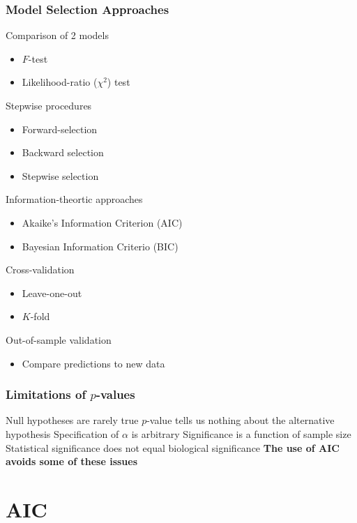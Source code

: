 \documentclass[color=usenames,dvipsnames]{beamer}\usepackage[]{graphicx}\usepackage[]{color}
\begin{document}
\begin{frame}
  \frametitle{Model Selection Approaches}
  Comparison of 2 models
  \begin{itemize}
    \item $F$-test
    \item Likelihood-ratio ($\chi^2$) test
  \end{itemize}
  \pause
  Stepwise procedures
  \begin{itemize}
    \item Forward-selection
    \item Backward selection
    \item Stepwise selection
  \end{itemize}
  \pause
  Information-theortic approaches
  \begin{itemize}
    \item Akaike's Information Criterion (AIC)
    \item Bayesian Information Criterio (BIC)
  \end{itemize}
  \pause
  Cross-validation
  \begin{itemize}
    \item Leave-one-out
    \item $K$-fold %
  \end{itemize}
  \pause
  Out-of-sample validation
  \begin{itemize}
    \item Compare predictions to new data
  \end{itemize}
\end{frame}


\begin{frame}
  \frametitle{Limitations of $p$-values}
  \large
  Null hypotheses are rarely true
  \pause
  \vfill
  $p$-value tells us nothing about the alternative hypothesis
  \pause
  \vfill
  Specification of $\alpha$ is arbitrary
  \pause
  \vfill
  Significance is a function of sample size
  \pause
  \vfill
  Statistical significance does not equal biological significance
  \pause
  \vfill
  \centering \bf
  The use of AIC avoids some of these issues \\
\end{frame}



\section{AIC}
\end{document}
